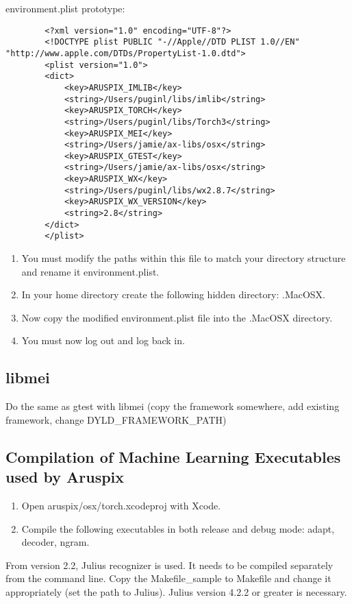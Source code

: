 \documentclass[]{article}
\begin{document}
	environment.plist prototype:
	\begin{verbatim}
		<?xml version="1.0" encoding="UTF-8"?>
		<!DOCTYPE plist PUBLIC "-//Apple//DTD PLIST 1.0//EN" "http://www.apple.com/DTDs/PropertyList-1.0.dtd">
		<plist version="1.0">
		<dict>
		    <key>ARUSPIX_IMLIB</key>
		    <string>/Users/puginl/libs/imlib</string>
		    <key>ARUSPIX_TORCH</key>
		    <string>/Users/puginl/libs/Torch3</string>
			<key>ARUSPIX_MEI</key>
			<string>/Users/jamie/ax-libs/osx</string>
			<key>ARUSPIX_GTEST</key>
			<string>/Users/jamie/ax-libs/osx</string>
		    <key>ARUSPIX_WX</key>
		    <string>/Users/puginl/libs/wx2.8.7</string>
		    <key>ARUSPIX_WX_VERSION</key>
		    <string>2.8</string>
		</dict>
		</plist>
	\end{verbatim}
	\begin{enumerate}
		\item You must modify the paths within this file to match your directory structure and rename it environment.plist.
		\item In your home directory create the following hidden directory: .MacOSX.
		\item Now copy the modified environment.plist file into the .MacOSX directory.
		\item You must now log out and log back in.
	\end{enumerate}


\subsection{libmei}
Do the same as gtest with libmei (copy the framework somewhere, add existing framework, change DYLD\_FRAMEWORK\_PATH)
	
\subsection{Compilation of Machine Learning Executables used by Aruspix}
	\begin{enumerate}
		\item Open aruspix/osx/torch.xcodeproj with Xcode.
		\item Compile the following executables in both release and debug mode: adapt, decoder, ngram.
	\end{enumerate}
	
	From version 2.2, Julius recognizer is used. It needs to be compiled separately from the command line. Copy the Makefile\_sample to Makefile and change it appropriately (set the path to Julius). Julius version 4.2.2 or greater is necessary.
	
\end{document}
